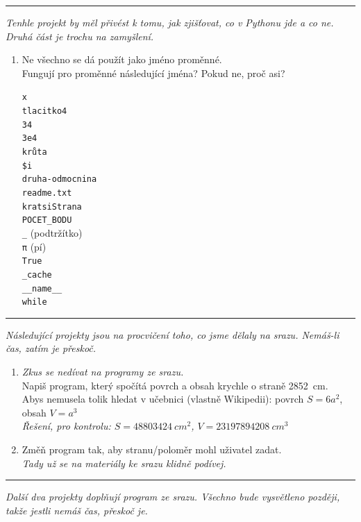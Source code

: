 \documentclass[a4paper,10pt]{article}
\newcommand\startsection[1]{
     \vspace{0.2ex}
    \hrule
    {\fontspec{Oxygen} \tiny
     \vspace{-1ex}
     \emph{#1}
     \vspace{-1.5em}
    }
}
\begin{document}
\startsection{Tenhle projekt by měl přivést k tomu, jak zjišťovat, co v Pythonu jde a co ne.
Druhá část je trochu na zamyšlení.}

\begin{enumerate}[resume]
\item Ne všechno se dá použít jako jméno proměnné.
    \\Fungují pro proměnné následující jména? Pokud ne, proč asi?
    {
        \newcommand\varname[2][]{\varnameend[#1]{#2}\\[0.25cm]}
        \newcommand\varnameend[2][]{\texttt{#2} #1}
        \begin{multicols}{4}
        \varname{x}
        \varname{tlacitko4}
        \varname{34}
        \varname{3e4}
        \varname{krůta}
        \varname{\$i}
        \varname{druha-odmocnina}
        \varname{readme.txt}
        \varname{kratsiStrana}
        \varname{POCET\_BODU}
        \varname[(podtržítko)]{\_}
        \varname[(pí)]{\textrm{π}}
        \varname{True}
        \varname{\_cache}
        \varname{\_\_name\_\_}
        \varnameend{while}
        \end{multicols}
    }

\end{enumerate}

\startsection{Následující projekty jsou na procvičení toho, co jsme dělaly na srazu.
Nemáš-li čas, zatím je přeskoč.}

\begin{enumerate}[resume]

\item \emph{\small Zkus se nedívat na programy ze srazu.}
    \\Napiš program, který spočítá povrch a obsah krychle o straně \SI{2852}{cm}.
    \\Abys nemusela tolik hledat v učebnici (vlastně Wikipedii): povrch $S=6a^2$, obsah $V=a^3$
    \\\emph{\small Řešení, pro kontrolu: $S=\SI{48803424}{cm^2}$, $V=\SI{23197894208}{cm^3}$}

\item Změň program tak, aby stranu/poloměr mohl uživatel zadat.
    \\\emph{\small Tady už se na materiály ke srazu klidně podívej.}

\end{enumerate}

\startsection{Další dva projekty doplňují program ze srazu. Všechno bude vysvětleno později, takže jestli nemáš čas, přeskoč je.}
\end{document}
